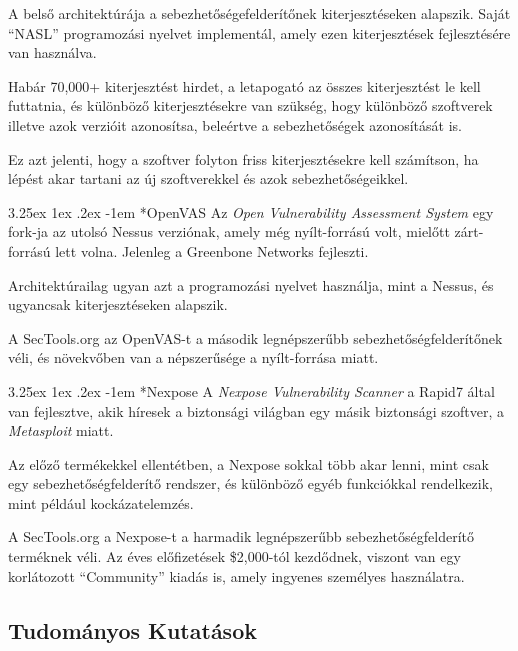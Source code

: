 \documentclass[a4paper,12pt]{article}
\makeatletter
\renewcommand\paragraph{\@startsection{paragraph}{6}{\parindent}%
  {3.25ex \@plus1ex \@minus .2ex}%
  {-1em}%
  {\normalfont\normalsize\bfseries}}
\makeatother
\begin{document}
	A belső architektúrája a sebezhetőségefelderítőnek kiterjesztéseken alapszik. Saját ``NASL'' programozási nyelvet implementál, amely ezen kiterjesztések fejlesztésére van használva.
	
	Habár 70,000+ kiterjesztést hirdet, a letapogató az összes kiterjesztést le kell futtatnia, és különböző kiterjesztésekre van szükség, hogy különböző szoftverek illetve azok verzióit azonosítsa, beleértve a sebezhetőségek azonosítását is.
	
	Ez azt jelenti, hogy a szoftver folyton friss kiterjesztésekre kell számítson, ha lépést akar tartani az új szoftverekkel és azok sebezhetőségeikkel.
	
	\paragraph*{OpenVAS} Az \textit{Open Vulnerability Assessment System}\cite{openvas} egy fork-ja az utolsó Nessus verziónak, amely még nyílt-forrású volt, mielőtt zárt-forrású lett volna. Jelenleg a Greenbone Networks fejleszti.
	
	Architektúrailag ugyan azt a programozási nyelvet használja, mint a Nessus, és ugyancsak kiterjesztéseken alapszik.
	
	A SecTools.org az OpenVAS-t a második legnépszerűbb sebezhetőségfelderítőnek véli, és növekvőben van a népszerűsége a nyílt-forrása miatt.
	
	\paragraph*{Nexpose} A \textit{Nexpose Vulnerability Scanner}\cite{nexpose} a Rapid7 által van fejlesztve, akik híresek a biztonsági világban egy másik biztonsági szoftver, a \textit{Metasploit} miatt.
	
	Az előző termékekkel ellentétben, a Nexpose sokkal több akar lenni, mint csak egy sebezhetőségfelderítő rendszer, és különböző egyéb funkciókkal rendelkezik, mint például kockázatelemzés.
	
	A SecTools.org a Nexpose-t a harmadik legnépszerűbb sebezhetőségfelderítő terméknek véli. Az éves előfizetések \$2,000-tól kezdődnek, viszont van egy korlátozott ``Community'' kiadás is, amely ingyenes személyes használatra.
	
\subsection{Tudományos Kutatások}
	
\end{document}
